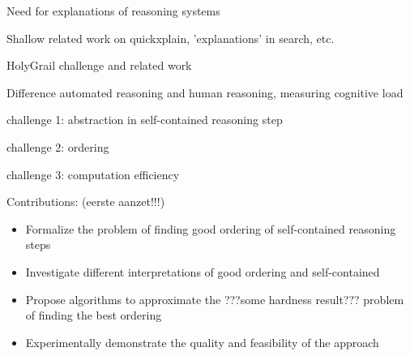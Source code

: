 Need for explanations of reasoning systems

Shallow related work on quickxplain, 'explanations' in search, etc.

HolyGrail challenge and related work

Difference automated reasoning and human reasoning, measuring cognitive load

challenge 1: abstraction in self-contained reasoning step

challenge 2: ordering

challenge 3: computation efficiency

Contributions: (eerste aanzet!!!)

\begin{itemize}
	\item Formalize the problem of finding good ordering of self-contained reasoning steps
	\item Investigate different interpretations of good ordering and self-contained
	\item Propose algorithms to approximate the ???some hardness result??? problem of finding the best ordering
	\item Experimentally demonstrate the quality and feasibility of the approach
\end{itemize}